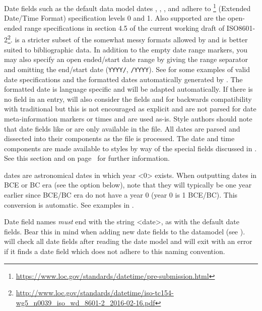 \documentclass{ltxdockit}[2011/03/25]
\newcommand*{\biblatex}{\sty{biblatex}\xspace}
\begin{document}
Date fields such as the default data model dates , , , and  adhere to  \footnote{\url{https://www.loc.gov/standards/datetime/pre-submission.html}} (Extended Date/Time Format) specification levels 0 and 1. Also supported are the open-ended range specifications in section 4.5 of the current working draft of ISO8601-2\footnote{\url{http://www.loc.gov/standards/datetime/iso-tc154-wg5_n0039_iso_wd_8601-2_2016-02-16.pdf}}.  is a stricter subset of the somewhat messy formats allowed by  and is better suited to bibliographic data. In addition to the  empty date range markers, you may also specify an open ended/start date range by giving the range separator and omitting the end/start date (\eg \texttt{YYYY/}, \texttt{/YYYY}). See  for some examples of valid date specifications and the formatted dates automatically generated by \biblatex. The formatted date is language specific and will be adapted automatically. If there is no  field in an entry, \biblatex will also consider the fields  and  for backwards compatibility with traditional \bibtex but this is not encouraged as explicit  and  are not parsed for date meta-information markers or times and are used as-is. Style authors should note that date fields like  or  are only available in the  file. All dates are parsed and dissected into their components as the  file is processed. The date and time components are made available to styles by way of the special fields discussed in . See this section and  on page~\pageref{aut:bbx:fld:tab1} for further information.

 dates are astronomical dates in which year <0> exists. When outputting dates in BCE or BC era (see the  option below), note that they will typically be one year earlier since BCE/BC era do not have a year 0 (year 0 is 1 BCE/BC). This conversion is automatic. See examples in .

Date field names \emph{must} end with the string <date>, as with the default date fields. Bear this in mind when adding new date fields to the datamodel (see ). \biblatex will check all date fields after reading the date model and will exit with an error if it finds a date field which does not adhere to this naming convention.
\end{document}
